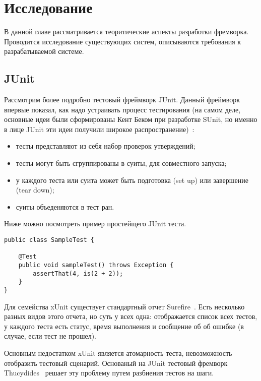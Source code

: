 \chapter{Исследование}
\label{chapter2}

В данной главе рассматривается теоритические аспекты разработки фремворка. Проводится исследование существующих систем, описываются требования к разрабатываемой системе.

\section{JUnit}

Рассмотрим более подробно тестовый фреймворк JUnit. Данный фреймворк впервые показал, как надо устраивать процесс тестирования (на самом деле, основные идеи были сформированы Кент Беком при разработке SUnit, но именно в лице JUnit эти идеи получили широкое распространение)~\cite{xunit_test_patterns}:

\begin{itemize}
\item тесты представляют из себя набор проверок утверждений;
\item тесты могут быть сгруппированы в суиты, для совместного запуска;
\item у каждого теста или суита может быть подготовка (set up) или завершение (tear down);
\item суиты объеденяются в тест ран.
\end{itemize}

Ниже можно посмотреть пример простейщего JUnit теста.

\begin{lstlisting}[caption=Простой JUnit тест.]
public class SampleTest {

    @Test
    public void sampleTest() throws Exception {
        assertThat(4, is(2 + 2));
    }
}
\end{lstlisting}

Для семейства xUnit существует стандартный отчет Surefire~\cite{surefire_home}. Есть несколько разных видов этого отчета, но суть у всех одна: отображается список всех тестов, у каждого теста есть статус, время выполнения и сообщение об об ошибке (в случае, если тест не прошел). 

Основным недостатком xUnit является атомарность теста, невозможность отобразить тестовый сценарий. Основаный на JUnit тестовый фремворк Thucydides~\cite{thucydides_home} решает эту проблему путем разбиения тестов на шаги.

